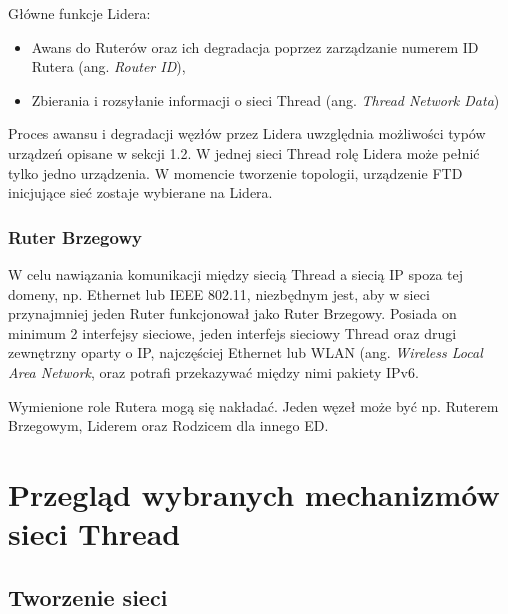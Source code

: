         Główne funkcje Lidera:
        \begin{itemize}
            \item Awans do Ruterów oraz ich degradacja poprzez zarządzanie numerem ID Rutera (ang. \textit{Router ID}),
            \item Zbierania i rozsyłanie informacji o sieci Thread (ang. \textit{Thread Network Data})
        \end{itemize}

        Proces awansu i degradacji węzłów przez Lidera uwzględnia możliwości typów urządzeń opisane w sekcji 1.2. W jednej sieci Thread rolę Lidera może pełnić tylko jedno urządzenia. W momencie tworzenie topologii, urządzenie FTD inicjujące sieć zostaje wybierane na Lidera.
        
        \subsubsection{Ruter Brzegowy}

        W celu nawiązania komunikacji między siecią Thread a siecią IP spoza tej domeny, np. Ethernet lub IEEE 802.11, niezbędnym jest, aby w sieci przynajmniej jeden Ruter funkcjonował jako Ruter Brzegowy. Posiada on minimum 2 interfejsy sieciowe, jeden interfejs sieciowy Thread oraz drugi zewnętrzny oparty o IP, najczęściej Ethernet lub WLAN (ang. \textit{Wireless Local Area Network}, oraz potrafi przekazywać między nimi pakiety IPv6.

    Wymienione role Rutera mogą się nakładać. Jeden węzeł może być np. Ruterem Brzegowym, Liderem oraz Rodzicem dla innego ED.

\section{Przegląd wybranych mechanizmów sieci Thread}

    \subsection{Tworzenie sieci}

